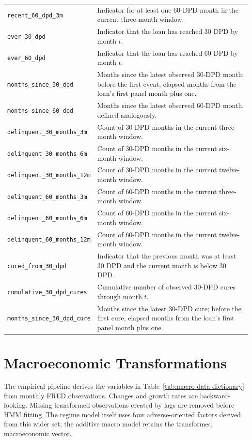 \begin{longtable}{L{0.31\textwidth}L{0.60\textwidth}}
\texttt{recent\_60\_dpd\_3m} & Indicator for at least one 60-DPD month in the current three-month window. \\
\texttt{ever\_30\_dpd} & Indicator that the loan has reached 30 DPD by month $t$. \\
\texttt{ever\_60\_dpd} & Indicator that the loan has reached 60 DPD by month $t$. \\
\texttt{months\_since\_30\_dpd} & Months since the latest observed 30-DPD month; before the first event, elapsed months from the loan's first panel month plus one. \\
\texttt{months\_since\_60\_dpd} & Months since the latest observed 60-DPD month, defined analogously. \\
\texttt{delinquent\_30\_months\_3m} & Count of 30-DPD months in the current three-month window. \\
\texttt{delinquent\_30\_months\_6m} & Count of 30-DPD months in the current six-month window. \\
\texttt{delinquent\_30\_months\_12m} & Count of 30-DPD months in the current twelve-month window. \\
\texttt{delinquent\_60\_months\_3m} & Count of 60-DPD months in the current three-month window. \\
\texttt{delinquent\_60\_months\_6m} & Count of 60-DPD months in the current six-month window. \\
\texttt{delinquent\_60\_months\_12m} & Count of 60-DPD months in the current twelve-month window. \\
\texttt{cured\_from\_30\_dpd} & Indicator that the previous month was at least 30 DPD and the current month is below 30 DPD. \\
\texttt{cumulative\_30\_dpd\_cures} & Cumulative number of observed 30-DPD cures through month $t$. \\
\texttt{months\_since\_30\_dpd\_cure} & Months since the latest 30-DPD cure; before the first cure, elapsed months from the loan's first panel month plus one. \\
\end{longtable}

\section{Macroeconomic Transformations}

The empirical pipeline derives the variables in Table~\ref{tab:macro-data-dictionary} from monthly FRED observations. Changes and growth rates are backward-looking. Missing transformed observations created by lags are removed before HMM fitting. The regime model itself uses four adverse-oriented factors derived from this wider set; the additive macro model retains the transformed macroeconomic vector.

